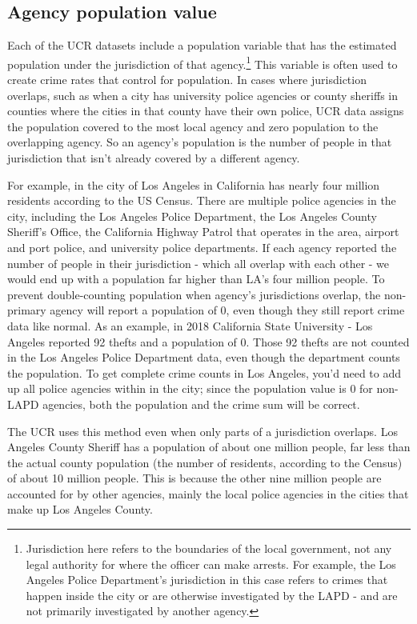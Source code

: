 \documentclass[
  12pt,
  openany]{book}
\begin{document}
\hypertarget{agency-population-value}{%
\subsection{Agency population value}\label{agency-population-value}}

Each of the UCR datasets include a population variable that has the estimated population under the jurisdiction of that agency.\footnote{Jurisdiction here refers to the boundaries of the local government, not any legal authority for where the officer can make arrests. For example, the Los Angeles Police Department's jurisdiction in this case refers to crimes that happen inside the city or are otherwise investigated by the LAPD - and are not primarily investigated by another agency.} This variable is often used to create crime rates that control for population. In cases where jurisdiction overlaps, such as when a city has university police agencies or county sheriffs in counties where the cities in that county have their own police, UCR data assigns the population covered to the most local agency and zero population to the overlapping agency. So an agency's population is the number of people in that jurisdiction that isn't already covered by a different agency.

For example, in the city of Los Angeles in California has nearly four million residents according to the US Census. There are multiple police agencies in the city, including the Los Angeles Police Department, the Los Angeles County Sheriff's Office, the California Highway Patrol that operates in the area, airport and port police, and university police departments. If each agency reported the number of people in their jurisdiction - which all overlap with each other - we would end up with a population far higher than LA's four million people. To prevent double-counting population when agency's jurisdictions overlap, the non-primary agency will report a population of 0, even though they still report crime data like normal. As an example, in 2018 California State University - Los Angeles reported 92 thefts and a population of 0. Those 92 thefts are not counted in the Los Angeles Police Department data, even though the department counts the population. To get complete crime counts in Los Angeles, you'd need to add up all police agencies within in the city; since the population value is 0 for non-LAPD agencies, both the population and the crime sum will be correct.

The UCR uses this method even when only parts of a jurisdiction overlaps. Los Angeles County Sheriff has a population of about one million people, far less than the actual county population (the number of residents, according to the Census) of about 10 million people. This is because the other nine million people are accounted for by other agencies, mainly the local police agencies in the cities that make up Los Angeles County.
\end{document}
